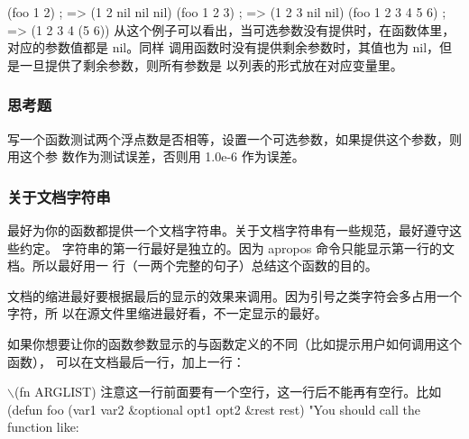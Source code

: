 \documentclass[11pt]{ctexart}
\begin{document}
(foo 1 2)                               ; => (1 2 nil nil nil)
(foo 1 2 3)                             ; => (1 2 3 nil nil)
(foo 1 2 3 4 5 6)                       ; => (1 2 3 4 (5 6))
从这个例子可以看出，当可选参数没有提供时，在函数体里，对应的参数值都是 nil。同样
调用函数时没有提供剩余参数时，其值也为 nil，但是一旦提供了剩余参数，则所有参数是
以列表的形式放在对应变量里。

\subsubsection{思考题}
\label{sec:org9e02320}
写一个函数测试两个浮点数是否相等，设置一个可选参数，如果提供这个参数，则用这个参
数作为测试误差，否则用 1.0e-6 作为误差。

\subsubsection{关于文档字符串}
\label{sec:orgc07fa80}

最好为你的函数都提供一个文档字符串。关于文档字符串有一些规范，最好遵守这些约定。
字符串的第一行最好是独立的。因为 apropos 命令只能显示第一行的文档。所以最好用一
行（一两个完整的句子）总结这个函数的目的。

文档的缩进最好要根据最后的显示的效果来调用。因为引号之类字符会多占用一个字符，所
以在源文件里缩进最好看，不一定显示的最好。

如果你想要让你的函数参数显示的与函数定义的不同（比如提示用户如何调用这个函数），
可以在文档最后一行，加上一行：

$\backslash$(fn ARGLIST)
注意这一行前面要有一个空行，这一行后不能再有空行。比如
(defun foo (var1 var2 \&optional opt1 opt2 \&rest rest)
"You should call the function like:
\end{document}
